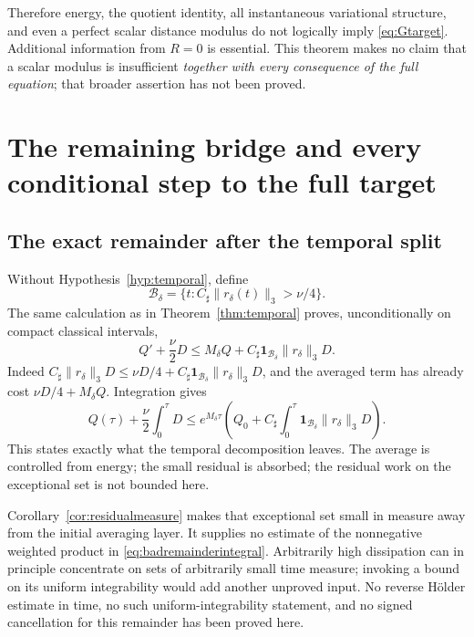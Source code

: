 \documentclass[11pt,a4paper]{article}
\theoremstyle{definition}\newtheorem{definition}[theorem]{Definition}
\theoremstyle{remark}\newtheorem{remark}[theorem]{Remark}
\newcommand{\norm}[1]{\lVert #1\rVert}
\numberwithin{equation}{section}
\begin{document}
Therefore energy, the quotient identity, all instantaneous variational structure, and even a perfect scalar distance modulus do not logically imply \eqref{eq:Gtarget}. Additional information from $R=0$ is essential. This theorem makes no claim that a scalar modulus is insufficient \emph{together with every consequence of the full equation}; that broader assertion has not been proved.

\section{The remaining bridge and every conditional step to the full target}
\label{sec:boundary}
\subsection{The exact remainder after the temporal split}
Without Hypothesis~\ref{hyp:temporal}, define
\[
 \mathcal B_\delta=\{t:C_\sharp\norm{r_\delta(t)}_3>\nu/4\}.
\]
The same calculation as in Theorem~\ref{thm:temporal} proves, unconditionally on compact classical intervals,
\begin{equation}\label{eq:badremainder}
 Q'+\frac\nu2D
 \le M_\delta Q+
 C_\sharp\mathbf1_{\mathcal B_\delta}\norm{r_\delta}_3D.
\end{equation}
Indeed $C_\sharp\norm{r_\delta}_3D\le\nu D/4+
C_\sharp\mathbf1_{\mathcal B_\delta}\norm{r_\delta}_3D$, and the averaged term has already cost $\nu D/4+M_\delta Q$. Integration gives
\begin{equation}\label{eq:badremainderintegral}
 Q(\tau)+\frac\nu2\int_0^\tau D
 \le e^{M_\delta\tau}
 \left(Q_0+C_\sharp\int_0^\tau
        \mathbf1_{\mathcal B_\delta}\norm{r_\delta}_3D\right).
\end{equation}
This states exactly what the temporal decomposition leaves. The average is controlled from energy; the small residual is absorbed; the residual work on the exceptional set is not bounded here.

Corollary~\ref{cor:residualmeasure} makes that exceptional set small in measure away from the initial averaging layer. It supplies no estimate of the nonnegative weighted product in \eqref{eq:badremainderintegral}. Arbitrarily high dissipation can in principle concentrate on sets of arbitrarily small time measure; invoking a bound on its uniform integrability would add another unproved input. No reverse H\"older estimate in time, no such uniform-integrability statement, and no signed cancellation for this remainder has been proved here.
\end{document}
